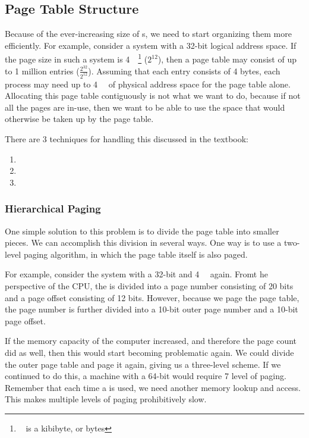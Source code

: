 \subsection{Page Table Structure}\label{subsec:Page_Table_Structure}
Because of the ever-increasing size of s, we need to start organizing them more efficiently.
For example, consider a system with a 32-bit logical address space.
If the page size in such a system is \SI{4}{\kibi\byte}\footnote{\si{\kibi\byte} is a kibibyte, or \si[prefixes-as-symbols=false]{\kibi} bytes} ($2^{12}$), then a page table may consist of up to 1 million entries ($\frac{2^{32}}{2^{12}}$).
Assuming that each entry consists of 4 bytes, each process may need up to \SI{4}{\mebi\byte} of physical address space for the page table alone.
Allocating this page table contiguously is not what we want to do, because if not all the pages are in-use, then we want to be able to use the space that would otherwise be taken up by the page table.

There are 3 techniques for handling this discussed in the textbook:
\begin{enumerate}[noitemsep]
\item {}
\item {}
\item {}
\end{enumerate}

\subsubsection{Hierarchical Paging}\label{subsubsec:Hierarchical_Paging}
One simple solution to this problem is to divide the page table into smaller pieces.
We can accomplish this division in several ways.
One way is to use a two-level paging algorithm, in which the page table itself is also paged.

For example, consider the system with a 32-bit  and \SI{4}{\kibi\byte} again.
Fromt he perspective of the CPU, the is divided into a page number consisting of 20 bits and a page offset consisting of 12 bits.
However, because we page the page table, the page number is further divided into a 10-bit outer page number and a 10-bit page offset.

If the memory capacity of the computer increased, and therefore the page count did as well, then this would start becoming problematic again.
We could divide the outer page table and page it again, giving us a three-level  scheme.
If we continued to do this, a machine with a 64-bit  would require 7 level of paging.
Remember that each time a  is used, we need another memory lookup and access.
This makes multiple levels of paging prohibitively slow.


